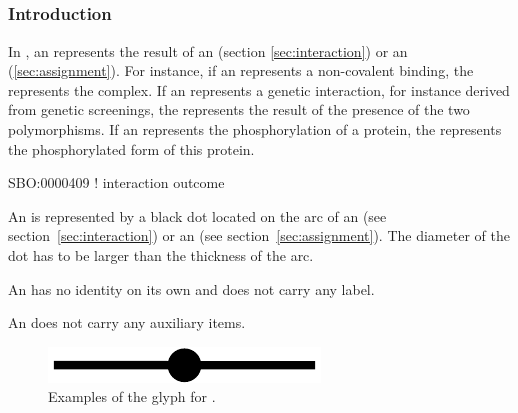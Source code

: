 
\color{red}
\subsection{}\label{sec:outcome}

\subsubsection{Introduction}

In \ER, an  represents the result of an  (section \ref{sec:interaction}) or an  (\ref{sec:assignment}). For instance, if an  represents a non-covalent binding, the  represents the complex. If an  represents a genetic interaction, for instance derived from genetic screenings, the  represents the result of the presence of the two polymorphisms. If an  represents the phosphorylation of a protein, the  represents the phosphorylated form of this protein.

\begin{glyphDescription}

\glyphSboTerm SBO:0000409 ! interaction outcome

\glyphContainer  An  is represented by a black dot located on the arc of an  (see section~\ref{sec:interaction}) or an  (see section~\ref{sec:assignment}). The diameter of the dot has to be larger than the thickness of the arc.

\glyphLabel An  has no identity on its own and does not carry any label. 

\glyphAux An  does not carry any auxiliary items.

\end{glyphDescription}

\begin{figure}[H]
  \centering
  \includegraphics[scale = 0.3, trim = 0 0 0 0.25in]{images/outcome}
  \caption{Examples of the \ER glyph for .}
  \label{fig:outcome}
\end{figure}

\normalcolor
	
